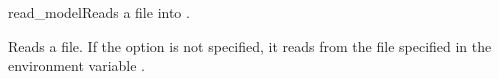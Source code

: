 \begin{nusmvCommand}{read\_model}{Reads a \nusmvhead file into
    \nusmvhead.}


Reads a \nusmv file. If the  option is not specified, it
reads from the file specified in the environment variable
.\\

\begin{cmdOpt}
\end{cmdOpt}

\end{nusmvCommand}
